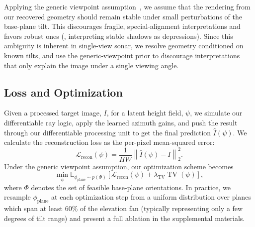 Applying the generic viewpoint assumption~\cite{Freeman1994GVA}, we assume {that the rendering from our recovered geometry should remain stable under small perturbations of the base-plane tilt}. This discourages fragile, special-alignment interpretations and favors robust ones (\eg, interpreting stable shadows as depressions). Since this ambiguity is inherent in single-view sonar, we resolve geometry conditioned on known tilts, and use the generic-viewpoint prior to discourage interpretations that only explain the image under a single viewing angle.


\subsection{Loss and Optimization}
Given a processed target image, $I$, for a latent height field, \(\psi\), we simulate our differentiable ray logic, apply the learned azimuth gains, and push the result through our differentiable processing unit to get the final prediction $\hat{I}(\psi)$. We calculate the reconstruction loss as the per-pixel mean-squared error:
\vspace{-2mm}
\begin{equation}
\mathcal{L}_{\text{recon}}(\psi)=\frac{1}{HW}\left\lVert \hat{I}(\psi)-I\right\rVert_2^2.
\end{equation}
Under the generic viewpoint assumption, our optimization scheme becomes
\begin{equation}
\label{eq:main_loss}
    \min_{\psi} \mathbb{E}_{\phi_{\text{plane}}\sim p(\Phi)}[\mathcal{L}_{\text{recon}}(\psi)+\lambda_{\text{TV}}\operatorname{TV}(\psi)],
\end{equation}
where \(\Phi\) denotes the set of feasible base-plane orientations. In practice, we resample \(\phi_{\text{plane}}\) at each optimization step from a uniform distribution over planes which span at least 60\% of the elevation fan (typically representing only a few degrees of tilt range) and present a full ablation in the supplemental materials.

